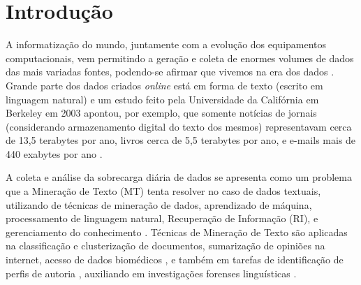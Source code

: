 \chapter{Introdução} \label{ch:Introdução}
    A informatização do mundo, juntamente com a evolução dos equipamentos computacionais, vem permitindo a geração e coleta de enormes volumes de dados das mais variadas fontes, podendo-se afirmar que vivemos na era dos dados \cite[p.~1]{Han:2011:DMC:1972541}.
    Grande parte dos dados criados \textit{online} está em forma de texto (escrito em linguagem natural) e um estudo feito pela Universidade da Califórnia em Berkeley em 2003 apontou, por exemplo, que somente notícias de jornais (considerando armazenamento digital do texto dos mesmos) representavam cerca de 13,5 terabytes por ano, livros cerca de 5,5 terabytes por ano, e e-mails mais de 440 exabytes por ano \cite{lyman2003much} \cite[p.~3]{Zhai2016TDMA}.
    
    A coleta e análise da sobrecarga diária de dados se apresenta como um problema que a Mineração de Texto (MT) tenta resolver no caso de dados textuais, utilizando de técnicas de mineração de dados, aprendizado de máquina, processamento de linguagem natural, Recuperação de Informação (RI), e gerenciamento do conhecimento \cite[p.~1]{Han:2011:DMC:1972541} \cite{Feldman:2006:TMH:1076381} \cite[p.~1241]{Sammut2017EMLDM}.
    Técnicas de Mineração de Texto são aplicadas na classificação e clusterização de documentos, sumarização de opiniões na internet, acesso de dados biomédicos \cite[p.~4--8]{Aggarwal_MTD_2012},
    e também em tarefas de identificação de perfis de autoria\footnotemark{} \cite[p.~906]{rangel2014overview} \cite[p.~6--7]{rangel2018overview}, auxiliando em investigações forenses linguísticas \cite{Chaski_Author_2012}. 
    
    
